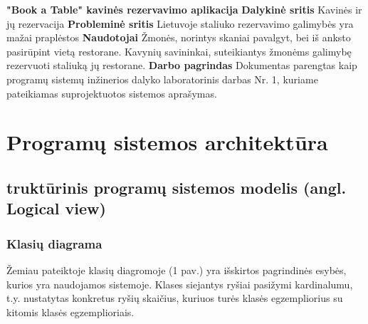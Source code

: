 \documentclass{VUMIFPSkursinis}
\begin{document}
\noindent
{\bfseries "Book a Table" kavinės rezervavimo aplikacija}
\newline
\newline
{\bfseries Dalykinė sritis}
\newline
Kavinės ir jų rezervacija
\newline
\newline
{\bfseries Probleminė sritis}
\newline
 Lietuvoje staliuko rezervavimo galimybės yra mažai praplėstos
\newline
\newline
{\bfseries Naudotojai}
\newline
Žmonės, norintys skaniai pavalgyt, bei iš anksto pasirūpint vietą restorane.
\newline
Kavynių savininkai, suteikiantys žmonėms galimybę rezervuoti staliuką jų restorane.
\newline
\newline
{\bfseries Darbo pagrindas}
\newline
Dokumentas parengtas kaip programų sistemų inžinerios dalyko laboratorinis darbas Nr. 1, kuriame pateikiamas suprojektuotos sistemos aprašymas.
\newline
\newline

\section{Programų sistemos architektūra}
\subsection{truktūrinis programų sistemos modelis (angl. Logical view)}
\subsubsection{Klasių diagrama}



Žemiau pateiktoje klasių diagromoje (1 pav.) yra išskirtos pagrindinės esybės, kurios yra naudojamos sistemoje. Klases siejantys ryšiai pasižymi kardinalumu, t.y. nustatytas konkretus ryšių skaičius, kuriuos turės klasės egzempliorius su kitomis klasės egzemplioriais.
\newline
\newline
\end{document}
